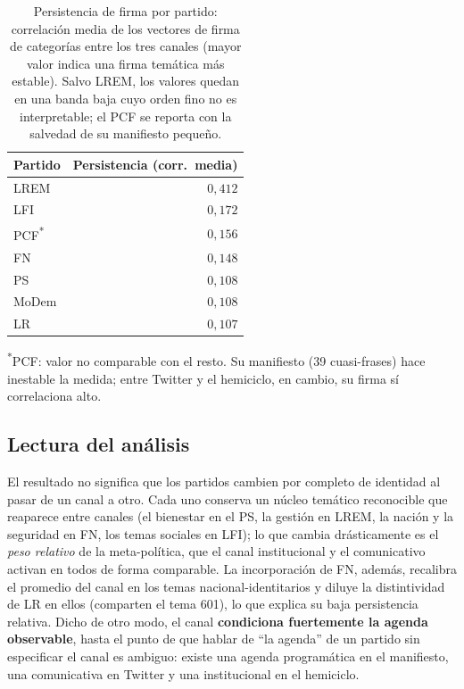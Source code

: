 \begin{table}[H]
\centering
\caption{Persistencia de firma por partido: correlación media de los vectores de
firma de categorías entre los tres canales (mayor valor indica una firma temática
más estable). Salvo LREM, los valores quedan en una banda baja cuyo orden fino no
es interpretable; el PCF se reporta con la salvedad de su manifiesto pequeño.}
\label{tab:persistencia-canal}
\begin{tabular}{@{}l r@{}}
\toprule
\textbf{Partido} & \textbf{Persistencia (corr.\ media)} \\
\midrule
LREM & $0{,}412$ \\
LFI & $0{,}172$ \\
PCF\textsuperscript{*} & $0{,}156$ \\
FN & $0{,}148$ \\
PS & $0{,}108$ \\
MoDem & $0{,}108$ \\
LR & $0{,}107$ \\
\bottomrule
\end{tabular}

{\footnotesize \textsuperscript{*}PCF: valor no comparable con el resto. Su
manifiesto (39 cuasi-frases) hace inestable la medida; entre Twitter y el
hemiciclo, en cambio, su firma sí correlaciona alto.}
\end{table}

\subsection{Lectura del análisis}
\label{sec:res-declarada-cierre}

El resultado no significa que los partidos cambien por completo de identidad al
pasar de un canal a otro. Cada uno conserva un núcleo temático reconocible que
reaparece entre canales (el bienestar en el PS, la gestión en LREM, la nación y
la seguridad en FN, los temas sociales en LFI); lo que cambia drásticamente es
el \emph{peso relativo} de la meta-política, que el canal institucional y el
comunicativo activan en todos de forma comparable. La incorporación de FN, además,
recalibra el promedio del canal en los temas nacional-identitarios y diluye la
distintividad de LR en ellos (comparten el tema 601), lo que explica su baja
persistencia relativa. Dicho de otro modo, el canal \textbf{condiciona fuertemente
la agenda observable}, hasta el punto de que hablar de ``la agenda'' de un partido
sin especificar el canal es ambiguo: existe una agenda programática en el
manifiesto, una comunicativa en Twitter y una institucional en el hemiciclo.

